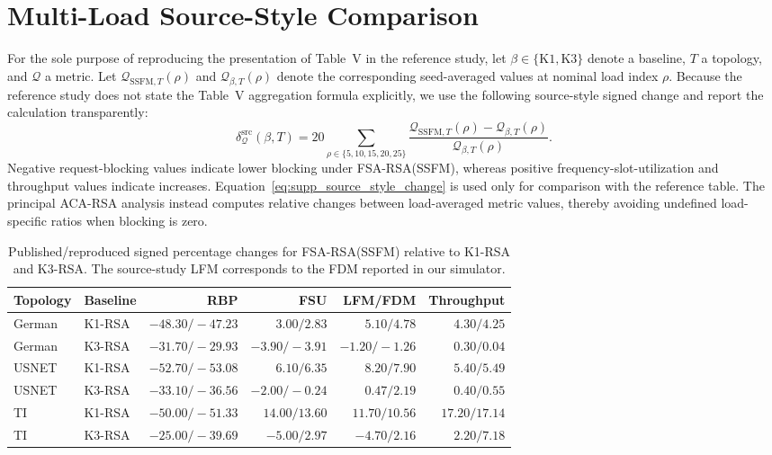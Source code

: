 \documentclass[letterpaper,journal]{IEEEtran}
\begin{document}
\section{Multi-Load Source-Style Comparison}

For the sole purpose of reproducing the presentation of Table~V in the
reference study, let \(\beta\in\{\mathrm{K1},\mathrm{K3}\}\) denote a
baseline, \(T\) a topology, and \(\mathcal{Q}\) a metric. Let
\(\mathcal{Q}_{\mathrm{SSFM},T}(\rho)\) and
\(\mathcal{Q}_{\beta,T}(\rho)\) denote the corresponding seed-averaged
values at nominal load index \(\rho\). Because the reference study does
not state the Table~V aggregation formula explicitly, we use the following
source-style signed change and report the calculation transparently:
\begin{equation}
\delta_{\mathcal{Q}}^{\mathrm{src}}(\beta,T)
=
20
\sum_{\rho\in\{5,10,15,20,25\}}
\frac{
\mathcal{Q}_{\mathrm{SSFM},T}(\rho)
-
\mathcal{Q}_{\beta,T}(\rho)
}{
\mathcal{Q}_{\beta,T}(\rho)
}.
\label{eq:supp_source_style_change}
\end{equation}
Negative request-blocking values indicate lower blocking under
FSA-RSA(SSFM), whereas positive frequency-slot-utilization and throughput
values indicate increases. Equation~\eqref{eq:supp_source_style_change} is
used only for comparison with the reference table. The principal ACA-RSA
analysis instead computes relative changes between load-averaged metric
values, thereby avoiding undefined load-specific ratios when blocking is
zero.

\begin{table}[t]
\centering
\caption{Published/reproduced signed percentage changes for FSA-RSA(SSFM)
relative to K1-RSA and K3-RSA. The source-study LFM corresponds to the FDM
reported in our simulator.}
\label{tab:supp_table5}
\scriptsize
\setlength{\tabcolsep}{5pt}
\begin{tabular}{llrrrr}
\toprule
\textbf{Topology} & \textbf{Baseline} &
\textbf{RBP} & \textbf{FSU} & \textbf{LFM/FDM} & \textbf{Throughput} \\
\midrule
German & K1-RSA & \(-48.30/-47.23\) & \(3.00/2.83\)
& \(5.10/4.78\) & \(4.30/4.25\) \\
German & K3-RSA & \(-31.70/-29.93\) & \(-3.90/-3.91\)
& \(-1.20/-1.26\) & \(0.30/0.04\) \\
USNET & K1-RSA & \(-52.70/-53.08\) & \(6.10/6.35\)
& \(8.20/7.90\) & \(5.40/5.49\) \\
USNET & K3-RSA & \(-33.10/-36.56\) & \(-2.00/-0.24\)
& \(0.47/2.19\) & \(0.40/0.55\) \\
TI & K1-RSA & \(-50.00/-51.33\) & \(14.00/13.60\)
& \(11.70/10.56\) & \(17.20/17.14\) \\
TI & K3-RSA & \(-25.00/-39.69\) & \(-5.00/2.97\)
& \(-4.70/2.16\) & \(2.20/7.18\) \\
\bottomrule
\end{tabular}
\end{table}
\end{document}
